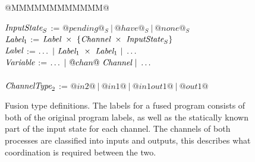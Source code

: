 
\begin{figure}

\begin{tabbing}
@MMMMMMMMMMMM@   \TABDEF \kill

$\textit{InputState}_S$ \> := \> $@pending@_S ~|~ @have@_S ~|~ @none@_S$
\\
$\textit{Label}_1$ \> := \> $\textit{Label}~\times~\{\textit{Channel} ~\times~ \textit{InputState}_S\}$ \\
$\textit{Label}$   \> := \> $\ldots ~|~\textit{Label}_1~\times~\textit{Label}_1 ~|~ \ldots$ \\
$\textit{Variable}$     \> := \> $\ldots ~|~@chan@~\textit{Channel} ~|~ \ldots$ \\
\\

$\textit{ChannelType}_2$   \> := \> $@in2@~|~@in1@~|~@in1out1@~|~@out1@$ \\
\end{tabbing}

\caption{Fusion type definitions.
The labels for a fused program consists of both of the original program labels, as well as the statically known part of the input state for each channel.
The channels of both processes are classified into inputs and outputs, this describes what coordination is required between the two.}
\label{fig:Fusion:Types}
\end{figure}


